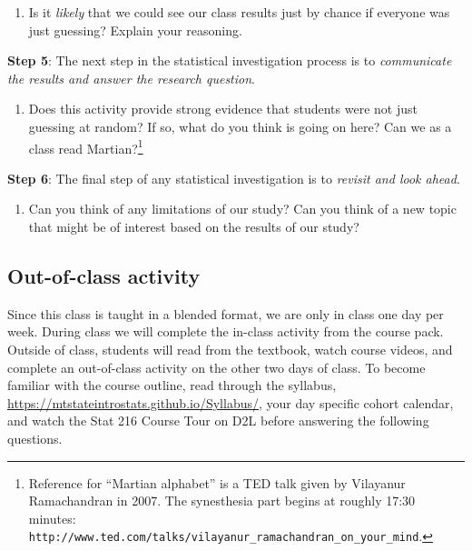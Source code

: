 \documentclass[
]{report}
\providecommand{\tightlist}{%
  \setlength{\itemsep}{0pt}\setlength{\parskip}{0pt}}
\begin{document}
\vspace{.5in}

\begin{enumerate}
\def\labelenumi{\arabic{enumi}.}
\setcounter{enumi}{16}
\tightlist
\item
  Is it \emph{likely} that we could see our class results just by chance if everyone was just guessing? Explain your reasoning.
\end{enumerate}

\newpage

\textbf{Step 5}: The next step in the statistical investigation process is to \emph{communicate the results and answer the research question}.

\begin{enumerate}
\def\labelenumi{\arabic{enumi}.}
\setcounter{enumi}{17}
\tightlist
\item
  Does this activity provide strong evidence that students were not just guessing at random? If so, what do you think is going on here? Can we as a class read Martian?\footnote{Reference for ``Martian alphabet'' is a TED talk given by Vilayanur Ramachandran in 2007. The synesthesia part begins at roughly 17:30 minutes: \texttt{http://www.ted.com/talks/vilayanur\_ramachandran\_on\_your\_mind}.}
\end{enumerate}

\vspace{1in}

\textbf{Step 6}: The final step of any statistical investigation is to \emph{revisit and look ahead}.

\begin{enumerate}
\def\labelenumi{\arabic{enumi}.}
\setcounter{enumi}{18}
\tightlist
\item
  Can you think of any limitations of our study? Can you think of a new topic that might be of interest based on the results of our study?
\end{enumerate}

\vspace{1in}

\newpage

\hypertarget{out-of-class-activity}{%
\subsection{Out-of-class activity}\label{out-of-class-activity}}

Since this class is taught in a blended format, we are only in class one day per week. During class we will complete the in-class activity from the course pack. Outside of class, students will read from the textbook, watch course videos, and complete an out-of-class activity on the other two days of class. To become familiar with the course outline, read through the syllabus, \url{https://mtstateintrostats.github.io/Syllabus/}, your day specific cohort calendar, and watch the Stat 216 Course Tour on D2L before answering the following questions.
\end{document}
